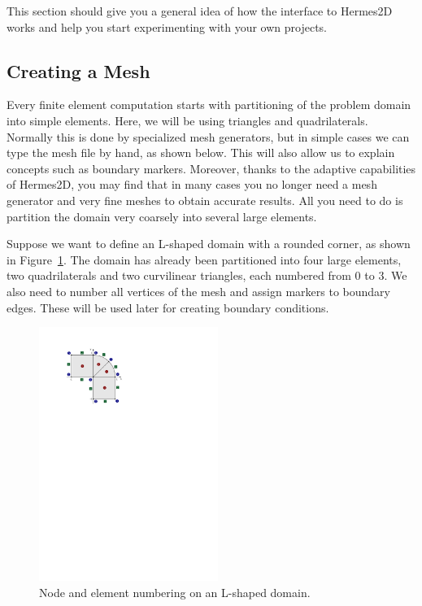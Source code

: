 
This section should give you a general idea of how the interface to Hermes2D works
and help you start experimenting with your own projects.



\subsection{Creating a Mesh}

Every finite element computation starts with partitioning of the problem domain
into simple elements. Here, we will be using triangles and quadrilaterals.
Normally this is done by specialized mesh generators, but in simple cases we
can type the mesh file by hand, as shown below. This will also allow us to explain
concepts such as boundary markers. Moreover, thanks to the adaptive capabilities
of Hermes2D, you may find that in many cases you no longer need a mesh generator
and very fine meshes to obtain accurate results. All you need to do is partition
the domain very coarsely into several large elements.

Suppose we want to define an L-shaped domain with a rounded corner, as shown in
Figure~\ref{fig:simplemesh}. The domain has already been partitioned into four large
elements, two quadrilaterals and two curvilinear triangles, each numbered from 0 to 3.
We also need to number all vertices of the mesh and assign markers to boundary edges.
These will be used later for creating boundary conditions.

\begin{figure}[ht]
  \smallskip\centering
  \includegraphics[width=0.52\textwidth]{img/simplemesh}
  \caption{Node and element numbering on an L-shaped domain.}
  \label{fig:simplemesh}
\end{figure}

